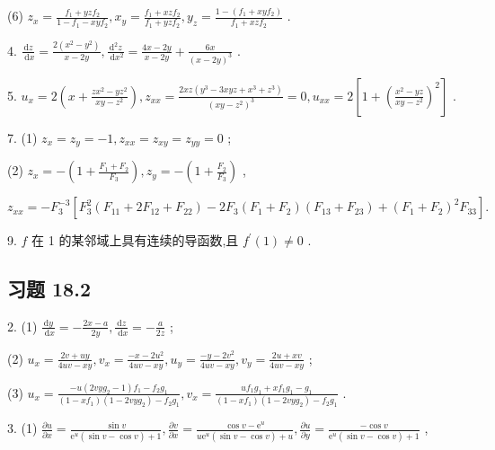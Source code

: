 (6) \({z}_{x} = \frac{{f}_{1} + {yz}{f}_{2}}{1 - {f}_{1} - {xy}{f}_{2}},{x}_{y} = \frac{{f}_{1} + {xz}{f}_{2}}{{f}_{1} + {yz}{f}_{2}},{y}_{z} = \frac{1 - \left( {{f}_{1} + {xy}{f}_{2}}\right) }{{f}_{1} + {xz}{f}_{2}}\) .

4. \(\frac{\mathrm{d}z}{\mathrm{\;d}x} = \frac{2\left( {{x}^{2} - {y}^{2}}\right) }{x - {2y}},\frac{{\mathrm{d}}^{2}z}{\mathrm{\;d}{x}^{2}} = \frac{{4x} - {2y}}{x - {2y}} + \frac{6x}{{\left( x - 2y\right) }^{3}}\) .

5. \({u}_{x} = 2\left( {x + \frac{z{x}^{2} - y{z}^{2}}{{xy} - {z}^{2}}}\right) ,{z}_{xx} = \frac{{2xz}\left( {{y}^{3} - {3xyz} + {x}^{3} + {z}^{3}}\right) }{{\left( xy - {z}^{2}\right) }^{3}} = 0,{u}_{xx} = 2\left\lbrack  {1 + {\left( \frac{{x}^{2} - {yz}}{{xy} - {z}^{2}}\right) }^{2}}\right\rbrack\) .

7. (1) \({z}_{x} = {z}_{y} =  - 1,{z}_{xx} = {z}_{xy} = {z}_{yy} = 0\) ;

(2) \({z}_{x} =  - \left( {1 + \frac{{F}_{1} + {F}_{2}}{{F}_{3}}}\right) ,{z}_{y} =  - \left( {1 + \frac{{F}_{2}}{{F}_{3}}}\right)\) ,

\({z}_{xx} =  - {F}_{3}^{-3}\left\lbrack  {{F}_{3}^{2}\left( {{F}_{11} + 2{F}_{12} + {F}_{22}}\right)  - 2{F}_{3}\left( {{F}_{1} + {F}_{2}}\right) \left( {{F}_{13} + {F}_{23}}\right)  + {\left( {F}_{1} + {F}_{2}\right) }^{2}{F}_{33}}\right\rbrack  .\)

9. \(f\) 在 1 的某邻域上具有连续的导函数,且 \({f}^{\prime }\left( 1\right)  \neq  0\) .

\subsection{习题 18.2}

2. (1) \(\frac{\mathrm{d}y}{\mathrm{\;d}x} =  - \frac{{2x} - a}{2y},\frac{\mathrm{d}z}{\mathrm{\;d}x} =  - \frac{a}{2z}\) ;

(2) \({u}_{x} = \frac{{2v} + {uy}}{{4uv} - {xy}},{v}_{x} = \frac{-x - 2{u}^{2}}{{4uv} - {xy}},{u}_{y} = \frac{-y - 2{v}^{2}}{{4uv} - {xy}},{v}_{y} = \frac{{2u} + {xv}}{{4uv} - {xy}}\) ;

(3) \({u}_{x} = \frac{-u\left( {{2vy}{g}_{2} - 1}\right) {f}_{1} - {f}_{2}{g}_{1}}{\left( {1 - x{f}_{1}}\right) \left( {1 - {2vy}{g}_{2}}\right)  - {f}_{2}{g}_{1}},{v}_{x} = \frac{u{f}_{1}{g}_{1} + x{f}_{1}{g}_{1} - {g}_{1}}{\left( {1 - x{f}_{1}}\right) \left( {1 - {2vy}{g}_{2}}\right)  - {f}_{2}{g}_{1}}\) .

3. (1) \(\frac{\partial u}{\partial x} = \frac{\sin v}{{\mathrm{e}}^{u}\left( {\sin v - \cos v}\right)  + 1},\frac{\partial v}{\partial x} = \frac{\cos v - {\mathrm{e}}^{u}}{u{\mathrm{e}}^{u}\left( {\sin v - \cos v}\right)  + u},\frac{\partial u}{\partial y} = \frac{-\cos v}{{\mathrm{e}}^{u}\left( {\sin v - \cos v}\right)  + 1}\) ,

